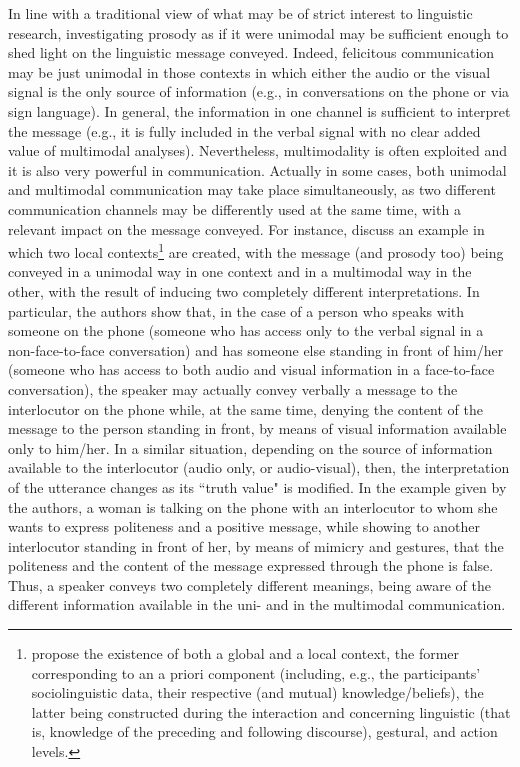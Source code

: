 \documentclass[output=paper]{langsci/langscibook}
\begin{document}
In line with a traditional view of what may be of strict interest to linguistic research, investigating prosody as if it were unimodal may be sufficient enough to shed light on the linguistic message conveyed. Indeed, felicitous communication may be just unimodal in those contexts in which either the audio or the visual signal is the only source of information (e.g., in conversations on the phone or via sign language). In general, the information in one channel is sufficient to interpret the message (e.g., it is fully included in the verbal signal with no clear added value of multimodal analyses). Nevertheless, multimodality is often exploited and it is also very powerful in communication. Actually in some cases, both unimodal and multimodal communication may take place simultaneously, as two different communication channels may be differently used at the same time, with a relevant impact on the message conveyed. For instance, \citet[118--119]{GiliFivela2014} discuss an example in which two local contexts\footnote{\citet{Akman.2003} propose the existence of both a global and a local context, the former corresponding to an a priori component (including, e.g., the participants’ sociolinguistic data, their respective (and mutual) knowledge\slash beliefs), the latter being constructed during the interaction and concerning linguistic (that is, knowledge of the preceding and following discourse), gestural, and action levels.} are created, with the message (and prosody too) being conveyed in a unimodal way in one context and in a multimodal way in the other, with the result of inducing two completely different interpretations. In particular, the authors show that, in the case of a person who speaks with someone on the phone (someone who has access only to the verbal signal in a non-face-to-face conversation) and has someone else standing in front of him\slash her (someone who has access to both audio and visual information in a face-to-face conversation), the speaker may actually convey verbally a message to the interlocutor on the phone while,  at the same time, denying the content of the message to the person standing in front, by means of visual information available only to him\slash her. In a similar situation, depending on the source of information available to the interlocutor (audio only, or audio-visual), then, the interpretation of the utterance changes as its ``truth value" is modified. In the example given by the authors, a woman is talking on the phone with an interlocutor to whom she wants to express politeness and a positive message, while showing to another interlocutor standing in front of her, by means of mimicry and gestures, that the politeness and the content of the message expressed through the phone is false. Thus, a speaker conveys two completely different meanings, being aware of the different information available in the uni- and in the multimodal communication. 
\end{document}
